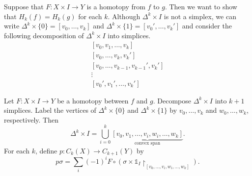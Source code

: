 \documentclass[10pt,letterpaper,cm]{nupset}
\theoremstyle{definition}
\theoremstyle{theorem}
\theoremstyle{remark}
\newcommand{\1}{\mathbb{1}}
\newcommand{\0}{\vec 0}
\begin{document}
Suppose that $F : X \times I \to Y$ is a homotopy from $f$ to $g$. Then we want to show that $H_k(f) =H_k(g)$ for each $k$. Although $\Delta^k \times I $ is not a simplex, we can write $\Delta^k \times \{0\} = \left[v_0, \ldots, v_k\right]$ and $\Delta^k \times  \{1\} = [v_0', \ldots, v_k']$ and consider the following decomposition of  $\Delta^k \times I$ into simplices. 
\begin{gather*}
\left[v_0, v_1,  \ldots, v_k\right]
\\ \left[v_0, \ldots,  v_k, v_k'\right]
\\ \left[v_0, \ldots,  v_{k-1}  , v_{k-1}', v_k'\right]
\\  \vdots
\\ \left[v_0', v_1',  \ldots, v_k'\right]
\end{gather*}

\smallskip

Let $F: X \times I \to Y$ be a homotopy between $f$ and $g$. 
Decompose $\Delta^k \times I$ into $k+1$ simplices. Label the vertices of $\Delta^k \times \{0\}$ and $\Delta^k \times \{1\}$ by $v_0, \ldots, v_k$ and $w_0, \ldots, w_k$, respectively. Then $$\Delta^k \times I = \bigcup_{i=0}^k \underbrace{[v_0, v_1, \ldots, v_i, w_i, \ldots, w_k]}_{\text{convex span}}.$$
For each $k$, define $p: C_k(X) \to C_{k+1}(Y)$ by $$ p\sigma = \sum_i ({-1})^i F \circ (\sigma \times \1_I \restriction_{[v_0, \ldots, v_i, w_i, \ldots, w_k]}).$$ 
\end{document}
